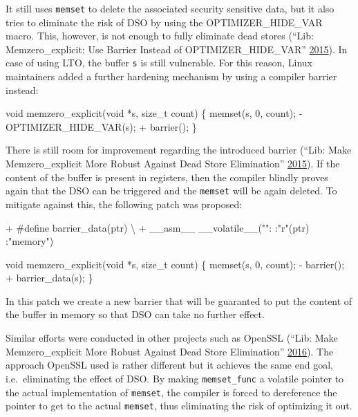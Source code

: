 \documentclass[a4paper,]{report}
\newenvironment{Shaded}{}{}
\newcommand{\DataTypeTok}[1]{\textcolor[rgb]{0.56,0.13,0.00}{#1}}
\newcommand{\DecValTok}[1]{\textcolor[rgb]{0.25,0.63,0.44}{#1}}
\newcommand{\NormalTok}[1]{#1}
\newcommand{\StringTok}[1]{\textcolor[rgb]{0.25,0.44,0.63}{#1}}
\begin{document}
It still uses \texttt{memset}  to delete the associated
security sensitive data, but it also tries to eliminate the risk of DSO
by using the OPTIMIZER\_HIDE\_VAR macro. This, however, is not enough to
fully eliminate dead stores (``Lib: Memzero\_explicit: Use Barrier
Instead of OPTIMIZER\_HIDE\_VAR''
\protect\hyperlink{ref-MemZeroBarrier}{2015}). In case of using LTO, the
buffer \texttt{s} is still vulnerable. For this reason, Linux
maintainers added a further hardening mechanism by using a compiler
barrier instead:

\begin{Shaded}
\begin{Highlighting}[]
\DataTypeTok{void}\NormalTok{ memzero_explicit(}\DataTypeTok{void}\NormalTok{ *s, }\DataTypeTok{size_t}\NormalTok{ count)}
\NormalTok{\{}
\NormalTok{  memset(s, }\DecValTok{0}\NormalTok{, count);}
\NormalTok{  - OPTIMIZER_HIDE_VAR(s);}
\NormalTok{  + barrier();}
\NormalTok{\}}
\end{Highlighting}
\end{Shaded}

There is still room for improvement regarding the introduced barrier
(``Lib: Make Memzero\_explicit More Robust Against Dead Store
Elimination'' \protect\hyperlink{ref-MemZeroDataBarrier}{2015}). If the
content of the buffer is present in registers, then the compiler blindly
proves again that the DSO can be triggered and the \texttt{memset} will
be again deleted. To mitigate against this, the following patch was
proposed:

\begin{Shaded}
\begin{Highlighting}[]
\NormalTok{+ #define barrier_data(ptr) \textbackslash{}}
\NormalTok{+  __asm__ __volatile__(}\StringTok{""}\NormalTok{: :}\StringTok{"r"}\NormalTok{(ptr) :}\StringTok{"memory"}\NormalTok{)}

\DataTypeTok{void}\NormalTok{ memzero_explicit(}\DataTypeTok{void}\NormalTok{ *s, }\DataTypeTok{size_t}\NormalTok{ count)}
\NormalTok{\{}
\NormalTok{  memset(s, }\DecValTok{0}\NormalTok{, count);}
\NormalTok{  - barrier();}
\NormalTok{  + barrier_data(s);}
\NormalTok{\}}
\end{Highlighting}
\end{Shaded}

In this patch we create a new barrier that will be guaranted to put the
content of the buffer in memory so that DSO can take no further effect.

Similar efforts were conducted in other projects such as OpenSSL (``Lib:
Make Memzero\_explicit More Robust Against Dead Store Elimination''
\protect\hyperlink{ref-OpenSSLMemClr}{2016}). The approach OpenSSL used
is rather different but it achieves the same end goal, i.e.~eliminating
the effect of DSO. By making \texttt{memset\_func} a volatile pointer to
the actual implementation of \texttt{memset}, the compiler is forced to
dereference the pointer to get to the actual \texttt{memset}, thus
eliminating the risk of optimizing it out.
\end{document}
